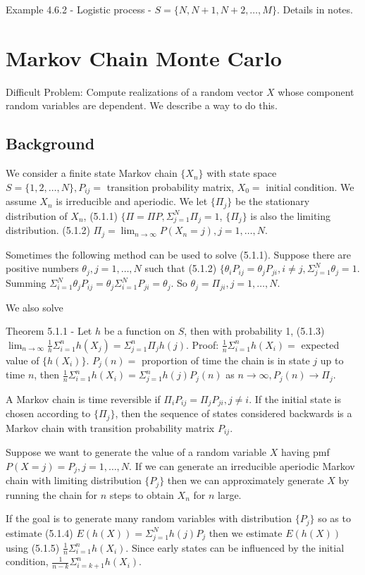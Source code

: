 \documentclass{article}
\begin{document}
Example 4.6.2 - Logistic process - $S = \{N, N+1, N+2, \dots, M\}$. Details in notes.

\section{Markov Chain Monte Carlo}

Difficult Problem: Compute realizations of a random vector $X$ whose component random variables are dependent. We describe a way to do this.

\subsection{Background}

We consider a finite state Markov chain $\{X_n\}$ with state space $S = \{1, 2, \dots, N\}, P_{ij} =$ transition probability matrix, $X_0 =$ initial condition. We assume $X_n$ is irreducible and aperiodic. We let $\{\Pi_j\}$ be the stationary distribution of $X_n$, (5.1.1) $\{\Pi = \Pi P, \Sigma_{j=1}^N \Pi_j = 1$, $\{\Pi_j\}$ is also the limiting distribution. (5.1.2) $\Pi_j = \lim_{n \rightarrow \infty} P(X_n = j), j = 1, \dots, N$.

Sometimes the following method can be used to solve (5.1.1). Suppose there are positive numbers $\theta_j, j = 1, \dots, N$ such that (5.1.2) $\{\theta_i P_{ij} = \theta_j P_{ji}, i \ne j, \Sigma_{j=1}^N \theta_j = 1$. Summing $\Sigma_{i=1}^N \theta_j P_{ij} = \theta_j \Sigma_{i=1}^N P_{ji} = \theta_j$. So $\theta_j = \Pi_{ji}, j = 1, \dots, N$.

We also solve

Theorem 5.1.1 - Let $h$ be a function on $S$, then with probability 1, (5.1.3) $\lim_{n \rightarrow \infty} \frac{1}{h} \Sigma_{i=1}^n h(X_j) = \Sigma_{j=1}^n \Pi_j h(j)$. Proof: $\frac{1}{n} \Sigma_{i=1}^n h(X_i) =$ expected value of $\{h(X_i)\}$. $P_j(n) =$ proportion of time the chain is in state $j$ up to time $n$, then $\frac{1}{n} \Sigma_{i=1}^n h(X_i) = \Sigma_{j=1}^n h(j) P_j(n)$ as $n \rightarrow \infty, P_j(n) \rightarrow \Pi_j$.

A Markov chain is time reversible if $\Pi_i P_{ij} = \Pi_j P_{ji}, j \ne i$. If the initial state is chosen according to $\{\Pi_j\}$, then the sequence of states considered backwards is a Markov chain with transition probability matrix $P_{ij}$.

Suppose we want to generate the value of a random variable $X$ having pmf $P(X=j) = P_j, j = 1, \dots, N$. If we can generate an irreducible aperiodic Markov chain with limiting distribution $\{P_j\}$ then we can approximately generate $X$ by running the chain for $n$ steps to obtain $X_n$ for $n$ large.

If the goal is to generate many random variables with distribution $\{P_j\}$ so as to estimate (5.1.4) $E(h(X)) = \Sigma_{j=1}^N h(j) P_j$ then we estimate $E(h(X))$ using (5.1.5) $\frac{1}{n} \Sigma_{i=1}^n h(X_i)$. Since early states can be influenced by the initial condition, $\frac{1}{n-k} \Sigma_{i=k+1}^n h(X_i)$.
\end{document}
